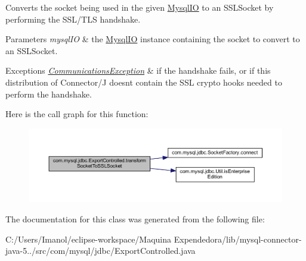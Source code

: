Converts the socket being used in the given \mbox{\hyperlink{classcom_1_1mysql_1_1jdbc_1_1_mysql_i_o}{Mysql\+IO}} to an S\+S\+L\+Socket by performing the S\+S\+L/\+T\+LS handshake.


\begin{DoxyParams}{Parameters}
{\em mysql\+IO} & the \mbox{\hyperlink{classcom_1_1mysql_1_1jdbc_1_1_mysql_i_o}{Mysql\+IO}} instance containing the socket to convert to an S\+S\+L\+Socket.\\
\hline
\end{DoxyParams}

\begin{DoxyExceptions}{Exceptions}
{\em \mbox{\hyperlink{classcom_1_1mysql_1_1jdbc_1_1_communications_exception}{Communications\+Exception}}} & if the handshake fails, or if this distribution of Connector/J doesn\textquotesingle{}t contain the S\+SL crypto hooks needed to perform the handshake. \\
\hline
\end{DoxyExceptions}
Here is the call graph for this function\+:
\nopagebreak
\begin{figure}[H]
\begin{center}
\leavevmode
\includegraphics[width=350pt]{classcom_1_1mysql_1_1jdbc_1_1_export_controlled_aa291734145187becb4f1fc5f54c65d04_cgraph}
\end{center}
\end{figure}


The documentation for this class was generated from the following file\+:\begin{DoxyCompactItemize}
\item 
C\+:/\+Users/\+Imanol/eclipse-\/workspace/\+Maquina Expendedora/lib/mysql-\/connector-\/java-\/5../src/com/mysql/jdbc/Export\+Controlled.\+java\end{DoxyCompactItemize}
